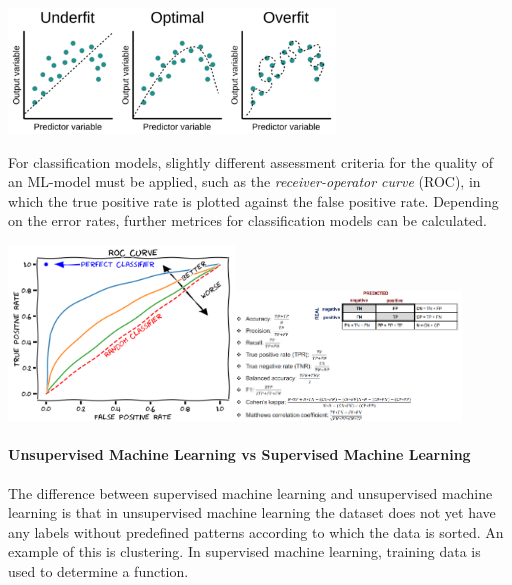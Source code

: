 \begin{center}\includegraphics[width=0.65\textwidth]{img/machine/MachineOverUnderFiting.png}\end{center}

For classification models, slightly different assessment criteria for the quality of an ML-model must be applied, such as the \emph{receiver-operator curve} (ROC), in which the true positive rate is plotted against the false positive rate. Depending on the error rates, further metrices for classification models can be calculated.

\begin{center}\includegraphics[width=0.45\textwidth]{img/machine/MachineRocCurve.png}\includegraphics[width=0.45\textwidth]{img/machine/MachineClassificationMetrices.png}\end{center}

\paragraph{Unsupervised Machine Learning vs Supervised Machine Learning}
The difference between supervised machine learning and unsupervised machine learning is that in unsupervised machine learning the dataset does not yet have any labels without predefined patterns according to which the data is sorted. An example of this is clustering. In supervised machine learning, training data is used to determine a function.

